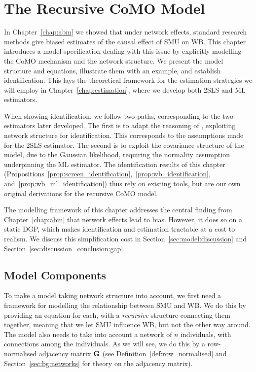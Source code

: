 
\chapter{The Recursive CoMO Model}
\label{chap:model}
In Chapter~\ref{chap:abm} we showed that under network effects, standard research methods give biased estimates of the causal effect of SMU on WB\@. This chapter introduces a model specification dealing with this issue by explicitly modelling the CoMO mechanism and the network structure. We present the model structure and equations, illustrate them with an example, and establish identification. This lays the theoretical framework for the estimation strategies we will employ in Chapter~\ref{chap:estimation}, where we develop both 2SLS and ML estimators.

When showing identification, we follow two paths, corresponding to the two estimators later developed. The first is to adapt the reasoning of \textcite{Bramoulle2009}, exploiting network structure for identification. This corresponds to the assumptions made for the 2SLS estimator. The second is to exploit the covariance structure of the model, due to the Gaussian likelihood, requiring the normality assumption underpinning the ML estimator. The identification results of this chapter (Propositions~\ref{prop:screen_identification},~\ref{prop:wb_identification}, and~\ref{prop:wb_ml_identification}) thus rely on existing tools, but are our own original derivations for the recursive CoMO model.

The modelling framework of this chapter addresses the central finding from Chapter~\ref{chap:abm} that network effects lead to bias. However, it does so on a static DGP, which makes identification and estimation tractable at a cost to realism. We discuss this simplification cost in Section~\ref{sec:model:discussion} and Section~\ref{sec:discussion_conclusion:gap}.

\section{Model Components}
\label{sec:model:components}
To make a model taking network structure into account, we first need a framework for modelling the relationship between SMU and WB\@. We do this by providing an equation for each, with a \emph{recursive} structure connecting them together, meaning that we let SMU influence WB, but not the other way around. The model also needs to take into account a network of $n$ individuals, with connections among the individuals. As we will see, we do this by a row-normalised adjacency matrix $\mathbf{G}$ (see Definition~\ref{def:row_normalised} and Section~\ref{sec:bg:networks} for theory on the adjacency matrix).

